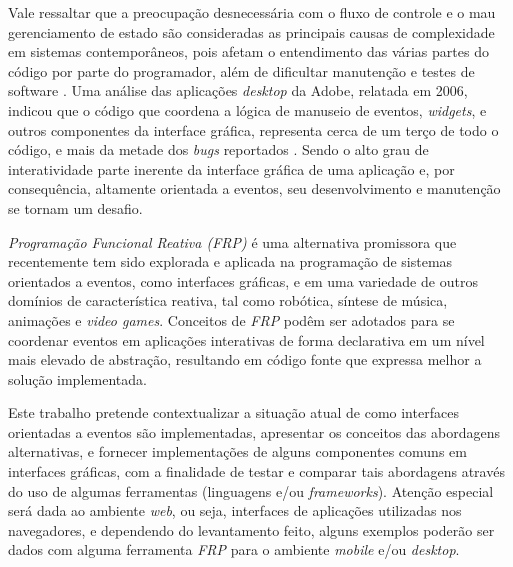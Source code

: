 Vale ressaltar que a preocupação desnecessária com o
fluxo de controle e o mau gerenciamento de estado são
consideradas as principais causas de complexidade em
sistemas contemporâneos, pois afetam o entendimento das
várias partes do código por parte do programador,
além de dificultar manutenção e testes de software
\cite{moseley06out}.
Uma análise das aplicações \emph{desktop} da Adobe,
relatada em 2006, indicou que o código que coordena a
lógica de manuseio de eventos, \emph{widgets}, e outros
componentes da interface gráfica, representa cerca de
um terço de todo o código, e mais da metade dos \emph{bugs}
reportados \cite{jarvi2008property}.
Sendo o alto grau de interatividade parte inerente da
interface gráfica de uma aplicação e, por consequência,
altamente orientada a eventos, seu desenvolvimento e
manutenção se tornam um desafio.

\emph{Programação Funcional Reativa (FRP)} é uma
alternativa promissora que recentemente tem sido
explorada e aplicada na programação de sistemas
orientados a eventos, como interfaces gráficas,
e em uma variedade de outros domínios
de característica reativa, tal como robótica,
síntese de música, animações e \emph{video games}.
Conceitos de \emph{FRP} podêm ser adotados para
se coordenar eventos em aplicações interativas de forma declarativa
em um nível mais elevado de abstração, resultando em
código fonte que expressa melhor a solução implementada.

Este trabalho pretende contextualizar a situação atual
de como interfaces orientadas a eventos são implementadas,
apresentar os conceitos das abordagens alternativas, e
fornecer implementações de alguns componentes comuns em
interfaces gráficas, com a finalidade de testar e comparar
tais abordagens através do uso de algumas ferramentas
(linguagens e/ou \emph{frameworks}). Atenção especial será
dada ao ambiente \emph{web}, ou seja, interfaces de
aplicações utilizadas nos navegadores, e dependendo do
levantamento feito, alguns exemplos poderão ser dados
com alguma ferramenta \emph{FRP} para o ambiente
\emph{mobile} e/ou \emph{desktop}.
